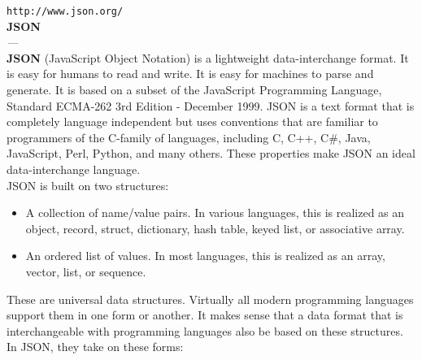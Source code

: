 \documentclass[11pt,twoside,a4paper]{article}
\def\maketitle{%
	\begin{center}
		\begin{tabular}[c]{c|c}
			\textsc{\textbf{Institution}}~\\[\baselineskip]~\\[\baselineskip]
			\emph{\textbf{Date 09-09-2009}}~\\[\baselineskip]~\\[\baselineskip]
			\emph{\textbf{Pr{\'e}cisions relatives au contexte}}~\\[\baselineskip]~\\[\baselineskip]
			\textsc{Auteur inestimable}~\\[\baselineskip]~\\[\baselineskip]
			& 
			\texttt{[image: img/logo\_glider.png]}~\\[\baselineskip]
		\end{tabular}
			~\\[\baselineskip]~\\[\baselineskip]
			\Huge{Titre principal}~\\[\baselineskip]
			\Large{Titre secondaire}~\\[\baselineskip]
		
		~\\[\baselineskip]
		~\\[\baselineskip]
	\large{
		\textsc{\textbf{Institution d'accueil et jury}}
		~\\[\baselineskip]
		<<titre personne>> : \texttt{Anne ONYME}~\\[\baselineskip]
		<<titre personne>> : \texttt{Jocelyn CONNU}~\\[\baselineskip]
		~\\[\baselineskip]
		\textit{Pr{\'e}cisions du contexte de r{\'e}daction de l'article}
	}

	\end{center}

}%
\begin{document}


\setlength\parindent{0pt}

\texttt{\small http://www.json.org/ }~\\

\textbf{\Large JSON}~\\
\emph{ --- }~\\

\textbf{JSON} (JavaScript Object Notation) is a lightweight data-interchange format. It is easy for humans to read and write. It is easy for machines to parse and generate. It is based on a subset of the JavaScript Programming Language, Standard ECMA-262 3rd Edition - December 1999. JSON is a text format that is completely language independent but uses conventions that are familiar to programmers of the C-family of languages, including C, C++, C\#, Java, JavaScript, Perl, Python, and many others. These properties make JSON an ideal data-interchange language. ~\\

JSON is built on two structures:
\begin{itemize}
	\item A collection of name/value pairs. In various languages, this is realized as an object, record, struct, dictionary, hash table, keyed list, or associative array.
    \item An ordered list of values. In most languages, this is realized as an array, vector, list, or sequence.
\end{itemize}

These are universal data structures. Virtually all modern programming languages support them in one form or another. It makes sense that a data format that is interchangeable with programming languages also be based on these structures.~\\

In JSON, they take on these forms:~\\

\end{document}
